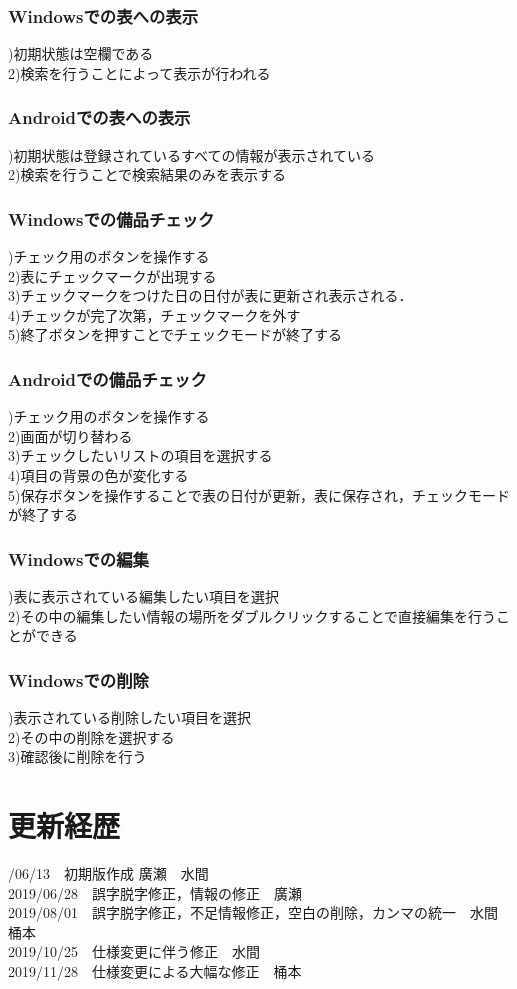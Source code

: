 \documentclass[11pt,a4j]{jarticle}
\begin{document}
\subsubsection{Windowsでの表への表示}
)初期状態は空欄である
\\2)検索を行うことによって表示が行われる

\subsubsection{Androidでの表への表示}
)初期状態は登録されているすべての情報が表示されている
\\2)検索を行うことで検索結果のみを表示する

\subsubsection{Windowsでの備品チェック}
)チェック用のボタンを操作する
\\2)表にチェックマークが出現する
\\3)チェックマークをつけた日の日付が表に更新され表示される．
\\4)チェックが完了次第，チェックマークを外す
\\5)終了ボタンを押すことでチェックモードが終了する

\subsubsection{Androidでの備品チェック}
)チェック用のボタンを操作する
\\2)画面が切り替わる
\\3)チェックしたいリストの項目を選択する
\\4)項目の背景の色が変化する
\\5)保存ボタンを操作することで表の日付が更新，表に保存され，チェックモードが終了する

\subsubsection{Windowsでの編集}
)表に表示されている編集したい項目を選択
\\2)その中の編集したい情報の場所をダブルクリックすることで直接編集を行うことができる

\subsubsection{Windowsでの削除}
)表示されている削除したい項目を選択
\\2)その中の削除を選択する
\\3)確認後に削除を行う

  \newpage
  \section{更新経歴}
  /06/13　初期版作成	廣瀬　水間
  \\2019/06/28　誤字脱字修正，情報の修正　廣瀬
  \\2019/08/01　誤字脱字修正，不足情報修正，空白の削除，カンマの統一　水間　桶本
  \\2019/10/25　仕様変更に伴う修正　水間
　\\2019/11/28　仕様変更による大幅な修正　桶本
\end{document}
